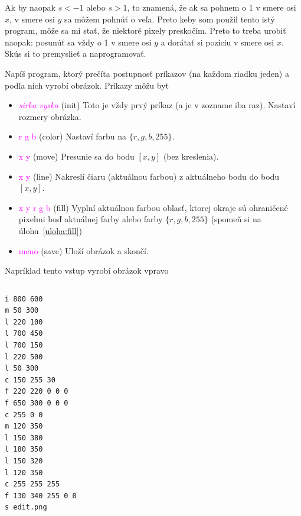 Ak by naopak $s<-1$ alebo $s>1$, to znamená, že ak sa pohnem o 1 v smere osi $x$,
v smere osi $y$ sa môžem pohnúť o veľa. Preto keby som použil tento istý program,
môže sa mi stať, že niektoré pixely preskočím. Preto to treba urobiť naopak:
posunúť sa vždy o 1 v smere osi $y$ a dorátať si pozíciu v smere osi $x$.
Skús si to premyslieť a naprogramovať.

\begin{uloha}
  \label{uloha:editor}
  Napíš program, ktorý prečíta postupnosť príkazov (na každom riadku jeden)
  a podľa nich vyrobí obrázok.
  Príkazy môžu byť
\def\tmp{\item \textcolor{magenta}}  
\begin{itemize}\itemsep=-1mm
    \tmp{ {\em sirka vyska}} 
      (init) Toto je vždy prvý príkaz (a je v zozname iba
      raz). Nastaví rozmery obrázka. 
      \tmp{ r g b} (color) Nastaví farbu na $\{r,g,b,255\}$.
    \tmp{ x y} (move) Presunie sa do bodu $[x,y]$ (bez kreslenia).
    \tmp{ x y} (line) Nakreslí čiaru (aktuálnou farbou) 
    z aktuálneho bodu do bodu $[x,y]$.
    \tmp{ x y r g b} (fill) Vyplní aktuálnou farbou oblasť, ktorej okraje
    sú ohraničené pixelmi buď aktuálnej farby alebo farby $\{r,g,b,255\}$ 
    (spomeň si na úlohu~\ref{uloha:fill})
    \tmp{ meno} (save) Uloží obrázok a skončí.
\end{itemize}

Napríklad tento vstup vyrobí obrázok vpravo

  \begin{column}{0.45}
\begin{Verbatim}
i 800 600
m 50 300
l 220 100
l 700 450
l 700 150
l 220 500
l 50 300
c 150 255 30
f 220 220 0 0 0
f 650 300 0 0 0
c 255 0 0
m 120 350
l 150 380
l 180 350
l 150 320
l 120 350
c 255 255 255
f 130 340 255 0 0
s edit.png
\end{Verbatim}
  \end{column}\hfill\begin{column}{0.45}
  {
\setlength{\fboxsep}{0pt}
  }
\end{column}
  \end{uloha}

